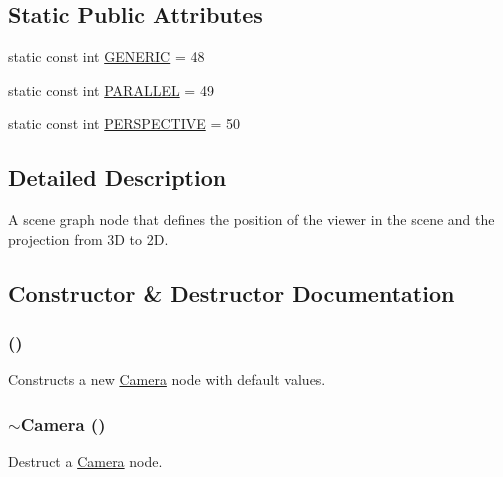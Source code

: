 \subsection*{Static Public Attributes}
\begin{CompactItemize}
\item 
static const int \hyperlink{classm3g_1_1Camera_48a4e153c97a1f4890558a77dfe02ca4}{GENERIC} = 48
\item 
static const int \hyperlink{classm3g_1_1Camera_d9630da0e9505afbb107c86229aa2f08}{PARALLEL} = 49
\item 
static const int \hyperlink{classm3g_1_1Camera_e62e72bde93e7d7ceb482e7a8c40dcf5}{PERSPECTIVE} = 50
\end{CompactItemize}


\subsection{Detailed Description}
A scene graph node that defines the position of the viewer in the scene and the projection from 3D to 2D. 

\subsection{Constructor \& Destructor Documentation}
\hypertarget{classm3g_1_1Camera_a3f3efcb2fcc75de885df29041103cd2}{
\subsubsection[{Camera}]{ ()}}
\label{classm3g_1_1Camera_a3f3efcb2fcc75de885df29041103cd2}


Constructs a new \hyperlink{classm3g_1_1Camera}{Camera} node with default values. \hypertarget{classm3g_1_1Camera_b921e886e6f14e117eb8099ccb0a3775}{
\subsubsection[{$\sim$Camera}]{\setlength{\rightskip}{0pt plus 5cm}$\sim${\bf Camera} ()}}
\label{classm3g_1_1Camera_b921e886e6f14e117eb8099ccb0a3775}


Destruct a \hyperlink{classm3g_1_1Camera}{Camera} node. 

